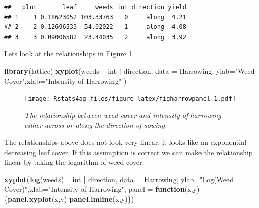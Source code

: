 \documentclass[letterpaper,]{book}
\newenvironment{Shaded}{\begin{snugshade}}{\end{snugshade}}
\newcommand{\ControlFlowTok}[1]{\textcolor[rgb]{0.13,0.29,0.53}{\textbf{#1}}}
\newcommand{\DataTypeTok}[1]{\textcolor[rgb]{0.13,0.29,0.53}{#1}}
\newcommand{\KeywordTok}[1]{\textcolor[rgb]{0.13,0.29,0.53}{\textbf{#1}}}
\newcommand{\NormalTok}[1]{#1}
\newcommand{\OperatorTok}[1]{\textcolor[rgb]{0.81,0.36,0.00}{\textbf{#1}}}
\newcommand{\StringTok}[1]{\textcolor[rgb]{0.31,0.60,0.02}{#1}}
\begin{document}
\begin{verbatim}
##   plot       leaf     weeds int direction yield
## 1    1 0.18623052 103.33763   0     along  4.21
## 2    2 0.12696533  54.02022   1     along  4.08
## 3    3 0.09006582  23.44035   2     along  3.92
\end{verbatim}

Lets look at the relationships in Figure \ref{fig:figharrowpanel}.



\begin{Shaded}
\begin{Highlighting}[]
\KeywordTok{library}\NormalTok{(lattice)}
\KeywordTok{xyplot}\NormalTok{(weeds }\OperatorTok{~}\StringTok{ }\NormalTok{int }\OperatorTok{|}\StringTok{ }\NormalTok{direction, }\DataTypeTok{data =}\NormalTok{ Harrowing,}
       \DataTypeTok{ylab=}\StringTok{"Weed Cover"}\NormalTok{,}\DataTypeTok{xlab=}\StringTok{"Intensity of Harrowing"}\NormalTok{  )     }
\end{Highlighting}
\end{Shaded}

\begin{figure}
\centering
\texttt{[image: Rstats4ag\_files/figure-latex/figharrowpanel-1.pdf]}
\caption{\label{fig:figharrowpanel}\emph{The relationship between weed cover and intensity of harrowing either across or along the direction of sowing.}}
\end{figure}

The relationships above does not look very linear, it looks like an exponential decreasing leaf cover. If this assumption is correct we can make the relationship linear by taking the logarithm of weed cover.



\begin{Shaded}
\begin{Highlighting}[]
\KeywordTok{xyplot}\NormalTok{(}\KeywordTok{log}\NormalTok{(weeds) }\OperatorTok{~}\StringTok{ }\NormalTok{int }\OperatorTok{|}\StringTok{ }\NormalTok{direction, }\DataTypeTok{data =}\NormalTok{ Harrowing,}
       \DataTypeTok{ylab=}\StringTok{"Log(Weed Cover)"}\NormalTok{,}\DataTypeTok{xlab=}\StringTok{"Intensity of Harrowing"}\NormalTok{,}
       \DataTypeTok{panel =} \ControlFlowTok{function}\NormalTok{(x,y)}
\NormalTok{       \{}\KeywordTok{panel.xyplot}\NormalTok{(x,y)}
        \KeywordTok{panel.lmline}\NormalTok{(x,y)\})}
\end{Highlighting}
\end{Shaded}
\end{document}
